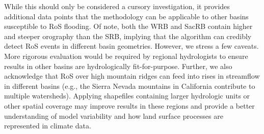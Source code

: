 \documentclass{article}
\begin{document}
While this should only be considered a cursory investigation, it provides additional data points that the methodology can be applicable to other basins susceptible to RoS flooding.
Of note, both the WRB and SacRB contain higher and steeper orography than the SRB, implying that the algorithm can credibly detect RoS events in different basin geometries.
However, we stress a few caveats. More rigorous evaluation would be required by regional hydrologists to ensure results in other basins are hydrologically fit-for-purpose.
Further, we also acknowledge that RoS over high mountain ridges can feed into rises in streamflow in different basins (e.g., the Sierra Nevada mountains in California contribute to multiple watersheds).
Applying shapefiles containing larger hydrologic units or other spatial coverage may improve results in these regions and provide a better understanding of model variability and how land surface processes are represented in climate data.



 
\end{document}
